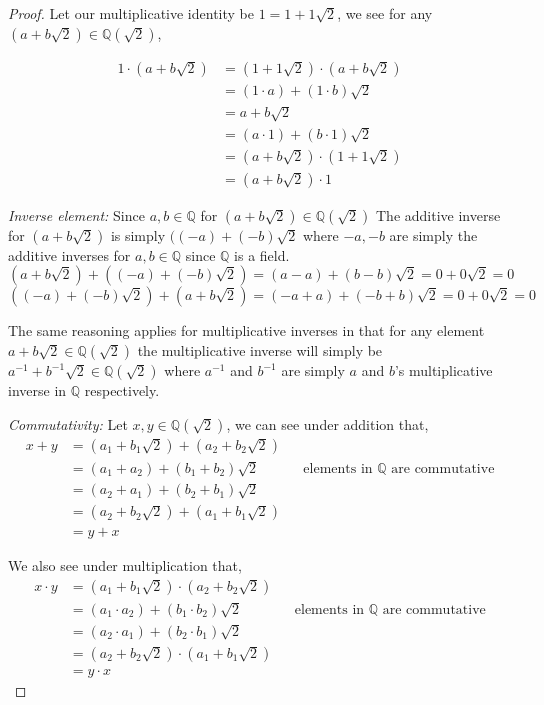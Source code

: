 \documentclass[12pt]{article}
\newcommand      {\Qm}         {{\mathbb Q}}
\begin{document}
\begin{itemize}
\begin{itemize}
\begin{proof}
        Let our multiplicative identity be $1 = 1 + 1 \sqrt{2}$, we see for any $(a+b\sqrt{2})\in \Qm(\sqrt{2})$,
        
        \begin{align*}
            1 \cdot (a + b\sqrt{2}) &= (1+1\sqrt{2}) \cdot (a+b\sqrt{2}) \\
            &= (1\cdot a) + (1\cdot b)\sqrt{2} \\
            &= a + b\sqrt{2} \\
            &= (a\cdot 1) + (b\cdot 1)\sqrt{2} \\
            &= (a+b\sqrt{2}) \cdot (1+1\sqrt{2}) \\
            &= (a+b\sqrt{2}) \cdot 1
        \end{align*}

        \textit{Inverse element:} Since $a,b\in \Qm$ for $(a+b\sqrt{2})\in\Qm(\sqrt{2})$ The additive inverse for $(a+b\sqrt{2})$ is simply $((-a)+(-b)\sqrt{2}$ where $-a,-b$ are simply the additive inverses for $a,b\in\Qm$ since $\Qm$ is a field. 
        \[(a+b\sqrt{2}) + ((-a)+(-b)\sqrt{2}) = (a-a) + (b-b)\sqrt{2} = 0+0\sqrt{2} = 0\]
        \[((-a)+(-b)\sqrt{2}) + (a+b\sqrt{2}) = (-a + a) + (-b + b)\sqrt{2} = 0+0\sqrt{2} = 0\]

        The same reasoning applies for multiplicative inverses in that for any element $a+b\sqrt{2}\in \Qm(\sqrt{2})$ the multiplicative inverse will simply be $a^{-1}+ b^{-1}\sqrt{2} \in \Qm(\sqrt{2})$ where $a^{-1}$ and $b^{-1}$ are simply $a$ and $b$'s multiplicative inverse in $\Qm$ respectively. 
        

        \textit{Commutativity:} Let $x,y\in \Qm(\sqrt{2})$, we can see under addition that,
        \begin{align*}
            x + y &= (a_1 + b_1\sqrt{2}) + (a_2 + b_2\sqrt{2}) \\
            &= (a_1 + a_2) + (b_1 + b_2)\sqrt{2} && \text{elements in $\Qm$ are commutative} \\
            &= (a_2 + a_1) + (b_2 + b_1)\sqrt{2} \\
            &= (a_2 + b_2\sqrt{2}) + (a_1 + b_1\sqrt{2})\\
            &= y + x 
        \end{align*}

        We also see under multiplication that,
        \begin{align*}
            x \cdot y &= (a_1 + b_1\sqrt{2}) \cdot (a_2 + b_2\sqrt{2}) \\
            &= (a_1 \cdot a_2) + (b_1 \cdot b_2)\sqrt{2} && \text{elements in $\Qm$ are commutative} \\
            &= (a_2 \cdot a_1) + (b_2 \cdot b_1)\sqrt{2} \\
            &= (a_2 + b_2\sqrt{2}) \cdot (a_1 + b_1\sqrt{2})\\
            &= y \cdot x 
        \end{align*}
        

\end{proof}
\end{itemize}
\end{itemize}
\end{document}
